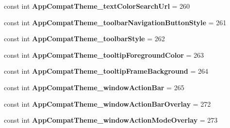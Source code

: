 \begin{DoxyCompactItemize}
\item 
\mbox{\label{classst_delivery_1_1_resource_1_1_styleable_a992b11dbf9372d5c91afc986696580d7}} 
const int {\bfseries App\+Compat\+Theme\+\_\+text\+Color\+Search\+Url} = 260
\item 
\mbox{\label{classst_delivery_1_1_resource_1_1_styleable_ac92601ba8fc0a4eea16b797f3ab05788}} 
const int {\bfseries App\+Compat\+Theme\+\_\+toolbar\+Navigation\+Button\+Style} = 261
\item 
\mbox{\label{classst_delivery_1_1_resource_1_1_styleable_a067fd8aec9bca18f402869f0bcccf2f2}} 
const int {\bfseries App\+Compat\+Theme\+\_\+toolbar\+Style} = 262
\item 
\mbox{\label{classst_delivery_1_1_resource_1_1_styleable_a4ba2881d05134fbe2eae632a49a4d758}} 
const int {\bfseries App\+Compat\+Theme\+\_\+tooltip\+Foreground\+Color} = 263
\item 
\mbox{\label{classst_delivery_1_1_resource_1_1_styleable_a185ffc5651e22221f9c2dc137b60397c}} 
const int {\bfseries App\+Compat\+Theme\+\_\+tooltip\+Frame\+Background} = 264
\item 
\mbox{\label{classst_delivery_1_1_resource_1_1_styleable_a440dcbb37fb045a5eafcb303ca4a681f}} 
const int {\bfseries App\+Compat\+Theme\+\_\+window\+Action\+Bar} = 265
\item 
\mbox{\label{classst_delivery_1_1_resource_1_1_styleable_ac0a469102f93f9d78f877caf8175ff8b}} 
const int {\bfseries App\+Compat\+Theme\+\_\+window\+Action\+Bar\+Overlay} = 272
\item 
\mbox{\label{classst_delivery_1_1_resource_1_1_styleable_aa11418a5e2ae3191feb70b6fb0e9218a}} 
const int {\bfseries App\+Compat\+Theme\+\_\+window\+Action\+Mode\+Overlay} = 273
\item 
\mbox{\label{classst_delivery_1_1_resource_1_1_styleable_a475092c0a4dbd41830d289046bbc041e}} 

\end{DoxyCompactItemize}
